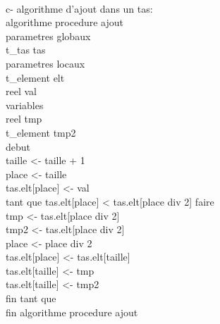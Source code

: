 \documentclass [11pt]{report}
\begin{document}
\vspace{5mm}\\
 c- algorithme d'ajout dans un tas:\\
algorithme procedure ajout\\
\indent parametres globaux\\
\indent \indent t\_tas tas\\
\indent parametres locaux\\
\indent \indent t\_element elt\\
\indent \indent reel val\\
\indent variables\\
\indent \indent reel tmp\\
\indent \indent t\_element tmp2\\
debut\\
\indent taille <- taille + 1\\
\indent place <- taille\\
\indent tas.elt[place] <- val\\
\indent tant que tas.elt[place] < tas.elt[place div 2] faire\\
\indent \indent tmp <- tas.elt[place div 2]\\
\indent \indent tmp2 <- tas.elt[place div 2]\\
\indent \indent place <- place div 2\\
\indent \indent tas.elt[place] <- tas.elt[taille]\\
\indent \indent tas.elt[taille] <- tmp\\
\indent \indent tas.elt[taille] <- tmp2\\
\indent  fin tant que\\
fin algorithme procedure ajout\\
\end{document}
